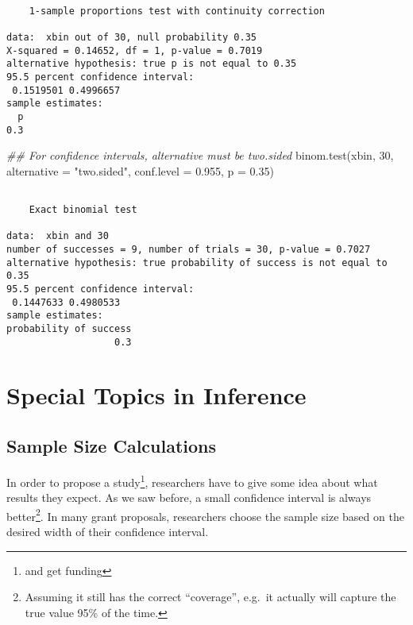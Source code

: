 \documentclass[
  letterpaper,
  DIV=11,
  numbers=noendperiod]{scrreprt}
\newenvironment{Shaded}{\begin{snugshade}}{\end{snugshade}}
\newcommand{\AttributeTok}[1]{\textcolor[rgb]{0.40,0.45,0.13}{#1}}
\newcommand{\DecValTok}[1]{\textcolor[rgb]{0.68,0.00,0.00}{#1}}
\newcommand{\DocumentationTok}[1]{\textcolor[rgb]{0.37,0.37,0.37}{\textit{#1}}}
\newcommand{\FloatTok}[1]{\textcolor[rgb]{0.68,0.00,0.00}{#1}}
\newcommand{\FunctionTok}[1]{\textcolor[rgb]{0.28,0.35,0.67}{#1}}
\newcommand{\NormalTok}[1]{\textcolor[rgb]{0.00,0.23,0.31}{#1}}
\newcommand{\StringTok}[1]{\textcolor[rgb]{0.13,0.47,0.30}{#1}}
\begin{document}
\begin{verbatim}

    1-sample proportions test with continuity correction

data:  xbin out of 30, null probability 0.35
X-squared = 0.14652, df = 1, p-value = 0.7019
alternative hypothesis: true p is not equal to 0.35
95.5 percent confidence interval:
 0.1519501 0.4996657
sample estimates:
  p 
0.3 
\end{verbatim}

\begin{Shaded}
\begin{Highlighting}[]
\DocumentationTok{\#\# For confidence intervals, alternative must be two.sided}
\FunctionTok{binom.test}\NormalTok{(xbin, }\DecValTok{30}\NormalTok{, }\AttributeTok{alternative =} \StringTok{"two.sided"}\NormalTok{, }\AttributeTok{conf.level =} \FloatTok{0.955}\NormalTok{, }\AttributeTok{p =} \FloatTok{0.35}\NormalTok{)}
\end{Highlighting}
\end{Shaded}

\begin{verbatim}

    Exact binomial test

data:  xbin and 30
number of successes = 9, number of trials = 30, p-value = 0.7027
alternative hypothesis: true probability of success is not equal to 0.35
95.5 percent confidence interval:
 0.1447633 0.4980533
sample estimates:
probability of success 
                   0.3 
\end{verbatim}

\hypertarget{special-topics-in-inference-1}{%
\section{Special Topics in
Inference}\label{special-topics-in-inference-1}}

\hypertarget{sample-size-calculations}{%
\subsection{Sample Size Calculations}\label{sample-size-calculations}}

In order to propose a study\footnote{and get funding}, researchers have
to give some idea about what results they expect. As we saw before, a
small confidence interval is always better\footnote{Assuming it still
  has the correct ``coverage'', e.g.~it actually will capture the true
  value 95\% of the time.}. In many grant proposals, researchers choose
the sample size based on the desired width of their confidence interval.
\end{document}
